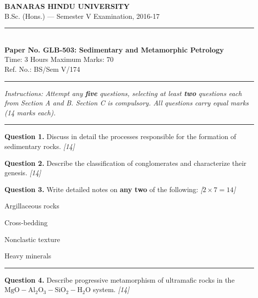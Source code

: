\documentclass[11pt,a4paper]{article}
\newcommand{\pts}[1]{\hfill   \textit{[#1]}}
\begin{document}
\begin{center}
  {\large\bfseries BANARAS HINDU UNIVERSITY}\\[2pt]
  {\normalsize B.Sc. (Hons.) --- Semester V Examination, 2016-17}\\[6pt]
  \rule{0.8\linewidth}{0.5pt}\\[6pt]
  {\large\bfseries Paper No. GLB-503: Sedimentary and Metamorphic Petrology}\\[4pt]
  {\normalsize Time: 3 Hours \hfill Maximum Marks: 70}\\[2pt]
  {\small Ref. No.: BS/Sem V/174}
\end{center}
\rule{\linewidth}{0.4pt}
\smallskip



\noindent   \textit{Instructions: Attempt any   \textbf{five} questions, selecting at least   \textbf{two} questions each from Section A and B. Section C is compulsory. All questions carry equal marks (14 marks each).}
\bigskip

\bigskip


\rule{\linewidth}{0.4pt}\smallskip




\noindent   \textbf{Question 1.} Discuss in detail the processes responsible for the formation of sedimentary rocks. \pts{14}

\medskip


\noindent   \textbf{Question 2.} Describe the classification of conglomerates and characterize their genesis. \pts{14}

\medskip


\noindent   \textbf{Question 3.} Write detailed notes on   \textbf{any two} of the following: \pts{$2  \times 7 = 14$}

\begin{parts}
  \item Argillaceous rocks
  \item Cross-bedding
  \item Nonclastic texture
  \item Heavy minerals
\end{parts}

\bigskip


\rule{\linewidth}{0.4pt}\smallskip




\noindent   \textbf{Question 4.} Describe progressive metamorphism of ultramafic rocks in the $ \text{MgO}- \text{Al}_2 \text{O}_3- \text{SiO}_2- \text{H}_2 \text{O}$ system. \pts{14}
\end{document}
